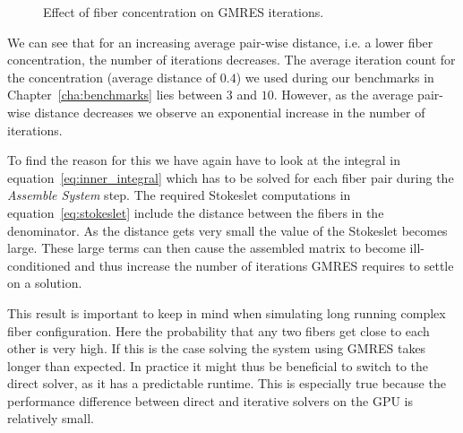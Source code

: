 \begin{figure}[!htbp]
  \centering
  \caption{Effect of fiber concentration on GMRES iterations.}
  \label{fig:concentration_gmres}
\end{figure}

We can see that for an increasing average pair-wise distance, i.e. a lower fiber concentration, the number of iterations decreases. The average iteration count for the concentration (average distance of $0.4$) we used during our benchmarks in Chapter~\ref{cha:benchmarks} lies between $3$ and $10$. However, as the average pair-wise distance decreases we observe an exponential increase in the number of iterations.

To find the reason for this we have again have to look at the integral in equation~\eqref{eq:inner_integral} which has to be solved for each fiber pair during the \emph{Assemble System} step. The required Stokeslet computations in equation~\eqref{eq:stokeslet} include the distance between the fibers in the denominator. As the distance gets very small the value of the Stokeslet becomes large. These large terms can then cause the assembled matrix to become ill-conditioned and thus increase the number of iterations GMRES requires to settle on a solution.

This result is important to keep in mind when simulating long running complex fiber configuration. Here the probability that any two fibers get close to each other is very high. If this is the case solving the system using GMRES takes longer than expected. In practice it might thus be beneficial to switch to the direct solver, as it has a predictable runtime. This is especially true because the performance difference between direct and iterative solvers on the GPU is relatively small.


